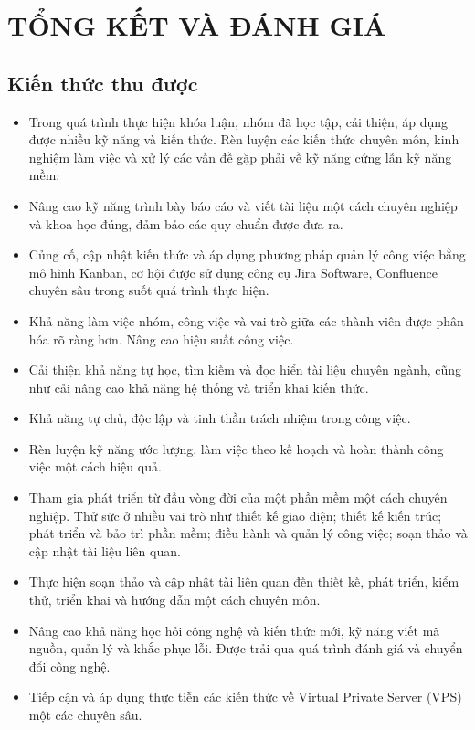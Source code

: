 \chapter{TỔNG KẾT VÀ ĐÁNH GIÁ}

\section{Kiến thức thu được}

\begin{itemize}
    \item Trong quá trình thực hiện khóa luận, nhóm đã học tập, cải thiện, áp dụng được nhiều kỹ năng và kiến thức. Rèn luyện các kiến thức chuyên môn, kinh nghiệm làm việc và xử lý các vấn đề gặp phải về kỹ năng cứng lẫn kỹ năng mềm:
    \item Nâng cao kỹ năng trình bày báo cáo và viết tài liệu một cách chuyên nghiệp và khoa học đúng, đảm bảo các quy chuẩn được đưa ra.
    \item Củng cố, cập nhật kiến thức và áp dụng phương pháp quản lý công việc bằng mô hình Kanban, cơ hội được sử dụng công cụ Jira Software, Confluence chuyên sâu trong suốt quá trình thực hiện.
    \item Khả năng làm việc nhóm, công việc và vai trò giữa các thành viên được phân hóa rõ ràng hơn. Nâng cao hiệu suất công việc.
    \item Cải thiện khả năng tự học, tìm kiếm và đọc hiển tài liệu chuyên ngành, cũng như cải nâng cao khả năng hệ thống và triển khai kiến thức.
    \item Khả năng tự chủ, độc lập và tinh thần trách nhiệm trong công việc.
    \item Rèn luyện kỹ năng ước lượng, làm việc theo kế hoạch và hoàn thành công việc một cách hiệu quả.
    \item Tham gia phát triển từ đầu vòng đời của một phần mềm một cách chuyên nghiệp. Thử sức ở nhiều vai trò như thiết kế giao diện; thiết kế kiến trúc; phát triển và bảo trì phần mềm; điều hành và quản lý công việc; soạn thảo và cập nhật tài liệu liên quan.
    \item Thực hiện soạn thảo và cập nhật tài liên quan đến thiết kế, phát triển, kiểm thử, triển khai và hướng dẫn một cách chuyên môn.
    \item Nâng cao khả năng học hỏi công nghệ và kiến thức mới, kỹ năng viết mã nguồn, quản lý và khắc phục lỗi. Được trải qua quá trình đánh giá và chuyển đổi công nghệ.
    \item Tiếp cận và áp dụng thực tiễn các kiến thức về Virtual Private Server (VPS) một các chuyên sâu.
\end{itemize}

